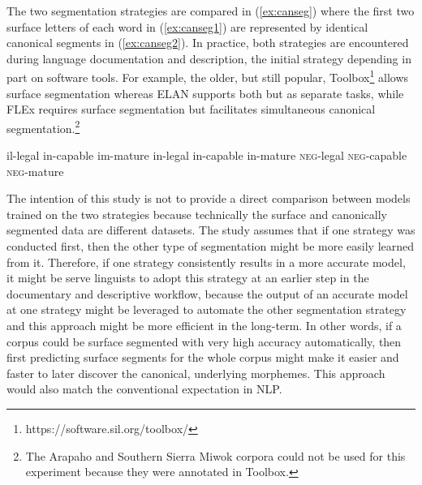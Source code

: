 The two segmentation strategies are compared in (\ref{ex:canseg}) where the first two surface letters of each word in (\ref{ex:canseg1}) are represented by identical canonical segments in (\ref{ex:canseg2}). In practice, both strategies are encountered during language documentation and description, the initial strategy depending in part on software tools. For example, the older, but still popular, Toolbox\footnote{https://software.sil.org/toolbox/} allows surface segmentation whereas ELAN \citep{auer_elan_2010} supports both but as separate tasks, while FLEx \citep{baines_overview_2018} requires surface segmentation but facilitates simultaneous canonical segmentation.\footnote{The Arapaho and Southern Sierra Miwok corpora could not be used for this experiment because they were annotated in Toolbox.}  


\pex   
\label{ex:canseg}
\a il-legal \hspace{6mm} in-capable \hspace{5mm} im-mature
\label{ex:canseg1}
\a in-legal \hspace{5mm} in-capable \hspace{5mm} in-mature
\label{ex:canseg2}
\a \textsc{neg}-legal \hspace{1mm} \textsc{neg}-capable \hspace{1mm} \textsc{neg}-mature
\label{ex:canseg3}
\xe


The intention of this study is not to provide a direct comparison between models trained on the two strategies because technically the surface and canonically segmented data are different datasets. The study assumes that if one strategy was conducted first, then the other type of segmentation might be more easily learned from it. Therefore, if one strategy consistently results in a more accurate model, it might be serve linguists to adopt this strategy at an earlier step in the documentary and descriptive workflow, because the output of an accurate model at one strategy might be leveraged to automate the other segmentation strategy and this approach might be more efficient in the long-term. In other words, if a corpus could be surface segmented with very high accuracy automatically, then first predicting surface segments for the whole corpus might make it easier and faster to later discover the canonical, underlying morphemes. This approach would also match the conventional expectation in NLP. 

